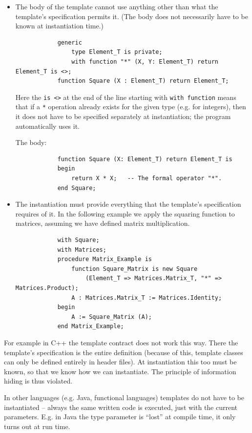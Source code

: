\documentclass[margin=0px]{article}
\begin{document}
\begin{itemize}
    \item	The body of the template cannot use anything other than what the template's specification permits it. (The body
          does not necessarily have to be known at instantiation time.)
          \begin{verbatim}
            generic
                type Element_T is private;
                with function "*" (X, Y: Element_T) return Element_T is <>;
            function Square (X : Element_T) return Element_T;
        \end{verbatim}
          Here the \texttt{is <>} at the end of the line starting with \texttt{with function} means that if a \texttt{*}
          operation already exists for the given type (e.g. for integers), then it does not have to be specified separately at instantiation; the program automatically uses it.

          The body:
          \begin{verbatim}
            function Square (X: Element_T) return Element_T is
            begin
                return X * X;   -- The formal operator "*".
            end Square;
        \end{verbatim}

    \item	The instantiation must provide everything that the template's specification requires of it.
          In the following example we apply the squaring function to matrices, assuming we have defined
          matrix multiplication.
          \begin{verbatim}
            with Square;
            with Matrices;
            procedure Matrix_Example is
                function Square_Matrix is new Square
                    (Element_T => Matrices.Matrix_T, "*" => Matrices.Product);
                A : Matrices.Matrix_T := Matrices.Identity;
            begin
                A := Square_Matrix (A);
            end Matrix_Example;
        \end{verbatim}
\end{itemize}

For example in C++ the template contract does not work this way. There the template's specification is the entire
definition (because of this, template classes can only be defined entirely in header files).
At instantiation this too must be known, so that we know how we can instantiate. The principle of information hiding
is thus violated.

In other languages (e.g. Java, functional languages) templates do not have to be instantiated -- always the same
written code is executed, just with the current parameters. E.g. in Java the type parameter is ``lost'' at compile time,
it only turns out at run time.
\end{document}
